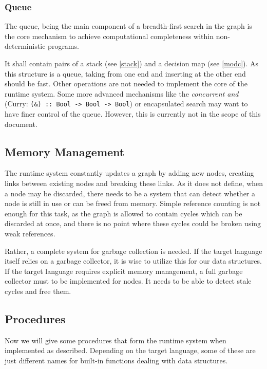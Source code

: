 \subsubsection{Queue}

The queue, being the main component of a breadth-first search in the graph is the core mechanism to achieve computational completeness within non-deterministic programs.

It shall contain pairs of a stack (see \ref{stack}) and a decision map (see \ref{modc}).
As this structure is a queue, taking from one end and inserting at the other end should be fast.
Other operations are not needed to implement the core of the runtime system.
Some more advanced mechanisms like the \emph{concurrent and} (Curry: \texttt{(\&) :: Bool -> Bool -> Bool}) or encapsulated search may want to have finer control of the queue.
However, this is currently not in the scope of this document.

\subsection{Memory Management}

The runtime system constantly updates a graph by adding new nodes, creating links between existing nodes and breaking these links.
As it does not define, when a node may be discarded, there needs to be a system that can detect whether a node is still in use or can be freed from memory.
Simple reference counting is not enough for this task, as the graph is allowed to contain cycles which can be discarded at once, and there is no point where these cycles could be broken using weak references.

Rather, a complete system for garbage collection is needed.
If the target language itself relies on a garbage collector, it is wise to utilize this for our data structures.
If the target language requires explicit memory management, a full garbage collector must to be implemented for nodes.
It needs to be able to detect stale cycles and free them.

\subsection{Procedures}

Now we will give some procedures that form the runtime system when implemented as described.
Depending on the target language, some of these are just different names for built-in functions dealing with data structures.


